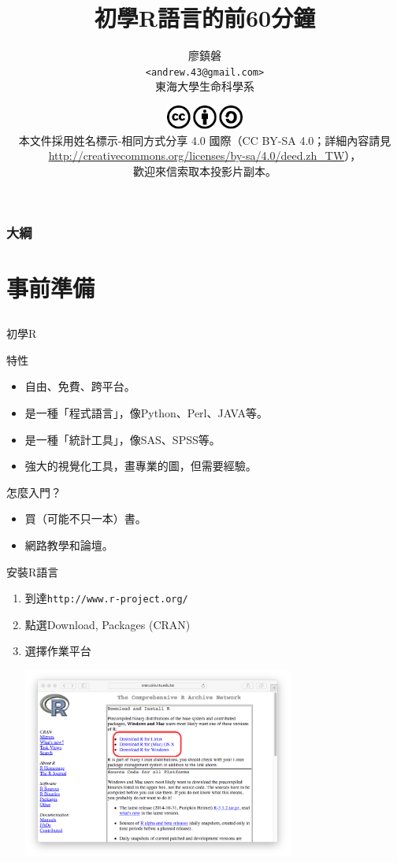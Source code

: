 \documentclass[12pt]{beamer}
\title[初學者學習R語言]{初學R語言的前60分鐘}
\author[廖鎮磐]{廖鎮磐 \\ \texttt{<andrew.43@gmail.com>}\\ 東海大學生命科學系}
\institute{\normalsize 2015年3月15日於蓮華池}
\date{\scriptsize \includegraphics[width=1in]{cc.pdf}\\[5pt]
本文件採用姓名標示-相同方式分享 4.0 國際（CC BY-SA 4.0；詳細內容請見 \url{http://creativecommons.org/licenses/by-sa/4.0/deed.zh_TW}），\\ 歡迎來信索取本投影片副本。}
\begin{document}
\begin{frame}
\titlepage
\end{frame}

\begin{frame}
\frametitle{大綱}
\tableofcontents
\end{frame}

\section{事前準備}\subsection{}

\begin{frame}{初學R}
\begin{block}{特性}
\begin{itemize}
\item 自由、免費、跨平台。
\item 是一種「程式語言」，像Python、Perl、JAVA等。
\item 是一種「統計工具」，像SAS、SPSS等。
\item 強大的視覺化工具，畫專業的圖，但需要經驗。
\end{itemize}
\end{block}
\begin{block}{怎麼入門？}
\begin{itemize}
\item 買（可能不只一本）書。
\item 網路教學和論壇。
\end{itemize}
\end{block}
\end{frame}

\begin{frame}[fragile]{安裝R語言}
\begin{enumerate}
\item 到達\texttt{http://www.r-project.org/}
\item 點選Download, Packages (CRAN) \\
\item 選擇作業平台
	\begin{center}\includegraphics[width=0.7\textwidth]{downloadR.png}\end{center}
\end{enumerate}
\end{frame}
\end{document}
